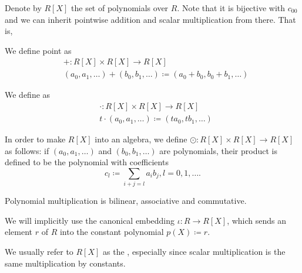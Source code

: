 \begin{definition}\label{def:algebra_of_polynomials}
  Denote by \( R[X] \) the set of polynomials over \( R \). Note that it is bijective with \( c_{00} \) and we can inherit pointwise addition and scalar multiplication from there. That is,

  \begin{defenum}
     We define  point as
    \begin{align*}
      &+: R[X] \times R[X] \to R[X] \\
      &(a_0, a_1, \ldots) + (b_0, b_1, \ldots) \coloneqq (a_0 + b_0, b_0 + b_1, \ldots)
    \end{align*}

     We define  as
    \begin{align*}
      &\cdot: R[X] \times R[X] \to R[X] \\
      &t \cdot (a_0, a_1, \ldots) \coloneqq (t a_0, t b_1, \ldots)
    \end{align*}

     In order to make \( R[X] \) into an algebra, we define  \( \odot: R[X] \times R[X] \to R[X] \) as follows: if \( (a_0, a_1, \ldots) \) and \( (b_0, b_1, \ldots) \) are polynomials, their product is defined to be the polynomial with coefficients
    \begin{equation}
      c_l \coloneqq \sum_{i+j=l} a_i b_j, l = 0, 1, \ldots.
    \end{equation}

    Polynomial multiplication is bilinear, associative and commutative.
  \end{defenum}

  We will implicitly use the canonical embedding \( \iota: R \to R[X] \), which sends an element \( r \) of \( R \) into the constant polynomial \( p(X) \coloneqq r \).

  We usually refer to \( R[X] \) as the , especially since scalar multiplication is the same multiplication by constants.
\end{definition}

